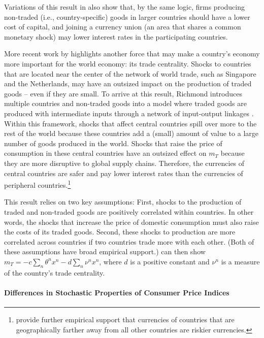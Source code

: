 \documentclass{ar-1col}
\begin{document}
Variations of this result in \citet{Hassan2013} also show that, by the same logic, firms producing non-traded (i.e., country-specific) goods in larger countries should have a lower cost of capital, and joining a currency union (an area that shares a common monetary shock) may lower interest rates in the participating countries.

More recent work by \citet{Richmond2019} highlights another force that may make a country's economy more important for the world economy: its trade centrality. Shocks to countries that are located near the center of the network of world trade, such as Singapore and the Netherlands, may have an outsized impact on the production of traded goods -- even if they are small. To arrive at this result, Richmond introduces multiple countries and non-traded goods into a model where traded goods are produced with intermediate inputs through a network of input-output linkages \citep{LongPlosser1983, Acemogluetal2012}. Within this framework, shocks that affect central countries spill over more to the rest of the world because these countries add a (small) amount of value to a large number of goods produced in the world. Shocks that raise the price of consumption in these central countries have an outsized effect on  $m_T$ because they are more disruptive to global supply chains. Therefore, the currencies of central countries are safer and pay lower interest rates than the currencies of peripheral countries.\footnote{\citet{LustigRichmond2020} provide further empirical support that currencies of countries that are geographically farther away from all other countries are riskier currencies.}   

This result relies on two key assumptions: First, shocks to the production of traded and non-traded goods are positively correlated within countries. In other words, the shocks that increase the price of domestic consumption must also raise the costs of its traded goods. Second, these shocks to production are more correlated across countries if two countries trade more with each other. (Both of these assumptions have broad empirical support.) \citet{Richmond2019} can then show $m_{T} = -c \sum_{n} \theta^n x^n- d\sum_{n} \nu^n x^n$, where $d$ is a positive constant and $\nu^n$ is a measure of the country's trade centrality.


\paragraph*{Differences in Stochastic Properties of Consumer Price Indices}
\end{document}
